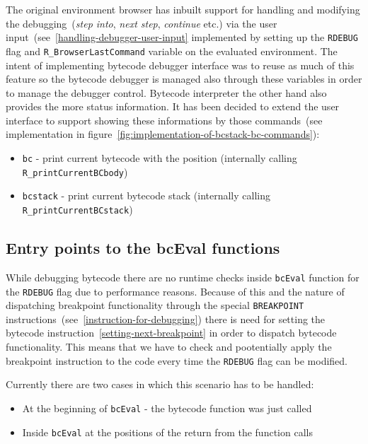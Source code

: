 \documentclass[thesis=M,english]{FITthesis}[2018/10/20]
\newcommand{\code}[1]{\texttt{#1}}
\begin{document}
{The original environment browser has inbuilt support for handling and modifying the debugging~(\textit{step into}, \textit{next step}, \textit{continue} etc.) via the user input~(see~\ref{handling-debugger-user-input} implemented by setting up the \code{RDEBUG} flag and \code{R{\_}BrowserLastCommand} variable on the evaluated environment. The intent of implementing bytecode debugger interface was to reuse as much of this feature so the bytecode debugger is managed also through these variables in order to manage the debugger control. Bytecode interpreter the other hand also provides the more status information. It has been decided to extend the user interface to support showing these informations by those commands~(see implementation in figure~\ref{fig:implementation-of-bcstack-bc-commands}):

\begin{itemize}
	\item \code{bc} - print current bytecode with the position
		(internally calling \code{R{\_}printCurrentBCbody})
	\item \code{bcstack} - print current bytecode stack
		(internally calling \code{R{\_}printCurrentBCstack})
\end{itemize}

\subsection{Entry points to the bcEval functions}

While debugging bytecode there are no runtime checks inside \code{bcEval} function for the \code{RDEBUG} flag due to performance reasons. Because of this and the nature of dispatching breakpoint functionality through the special \code{BREAKPOINT} instructions~(see~\ref{instruction-for-debugging}) there is need for setting the bytecode instruction~\ref{setting-next-breakpoint} in order to dispatch bytecode functionality. This means that we have to check and pootentially apply the breakpoint instruction to the code every time the \code{RDEBUG} flag can be modified.

Currently there are two cases in which this scenario has to be handled:

\begin{itemize}
	\item At the beginning of \code{bcEval} - the bytecode function was just called
	\item Inside \code{bcEval} at the positions of the return from the function calls
\end{itemize}

}
\end{document}
